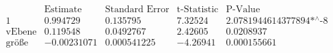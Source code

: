 \[\begin{array}{l|llll}
 \text{} & \text{Estimate} & \text{Standard Error} & \text{t-Statistic} & \text{P-Value} \\
\hline
 1 & 0.994729 & 0.135795 & 7.32524 & \text{2.0781944614377894$\grave{ }$*${}^{\wedge}$-8} \\
 \text{vEbene} & 0.119548 & 0.0492767 & 2.42605 & 0.0208937 \\
 \text{gr{\" o}{\ss}e} & -0.00231071 & 0.000541225 & -4.26941 & 0.000155661 \\
\end{array}\]

